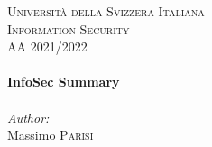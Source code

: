 \documentclass[12pt]{article}
\author{Massimo Parisi}
\date{Academic year 2021/2022}
\begin{document}

{\center %
 

\textsc{\LARGE Università della Svizzera Italiana}\\[1.5cm] %
\textsc{\Large Information Security}\\[0.5cm] %
\textsc{\large AA 2021/2022}\\[0.5cm] %


\HRule \\[0.4cm]
{ \huge \bfseries InfoSec Summary}\\[0.4cm] %
\HRule \\[1.5cm]
 

\Large \emph{Author:}\\
Massimo \textsc{Parisi}\\[1.5cm] %


}
\end{document}
